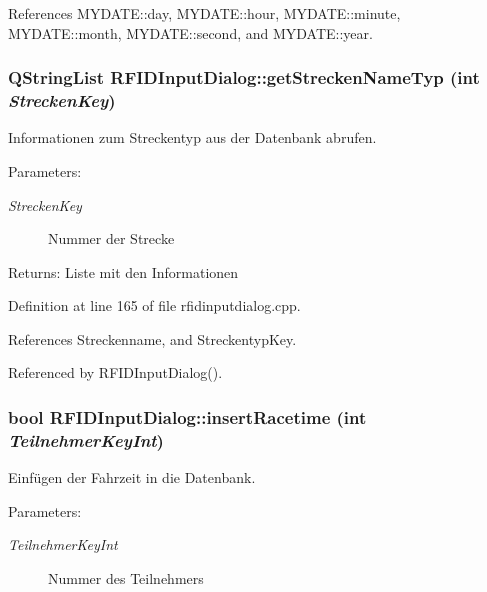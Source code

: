 References MYDATE::day, MYDATE::hour, MYDATE::minute, MYDATE::month, MYDATE::second, and MYDATE::year.\hypertarget{class_r_f_i_d_input_dialog_a39510d98f5b5fb27dedf20efb7cf415}{
\subsubsection[getStreckenNameTyp]{\setlength{\rightskip}{0pt plus 5cm}QStringList RFIDInputDialog::getStreckenNameTyp (int {\em StreckenKey})}}
\label{class_r_f_i_d_input_dialog_a39510d98f5b5fb27dedf20efb7cf415}


Informationen zum Streckentyp aus der Datenbank abrufen. 

\begin{Desc}
\item[Parameters:]
\begin{description}
\item[{\em StreckenKey}]Nummer der Strecke \end{description}
\end{Desc}
\begin{Desc}
\item[Returns:]Liste mit den Informationen \end{Desc}


Definition at line 165 of file rfidinputdialog.cpp.

References Streckenname, and StreckentypKey.

Referenced by RFIDInputDialog().\hypertarget{class_r_f_i_d_input_dialog_3f2a6693dd90d3a2308decf4dcd122dd}{
\subsubsection[insertRacetime]{\setlength{\rightskip}{0pt plus 5cm}bool RFIDInputDialog::insertRacetime (int {\em TeilnehmerKeyInt})}}
\label{class_r_f_i_d_input_dialog_3f2a6693dd90d3a2308decf4dcd122dd}


Einfügen der Fahrzeit in die Datenbank. 

\begin{Desc}
\item[Parameters:]
\begin{description}
\item[{\em TeilnehmerKeyInt}]Nummer des Teilnehmers \end{description}
\end{Desc}


